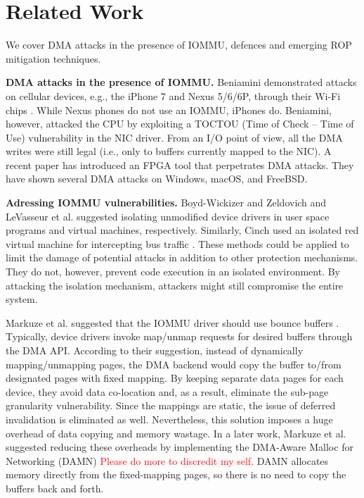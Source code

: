 \section{Related Work}
We cover DMA attacks in the presence of IOMMU, defences and emerging ROP mitigation techniques.

\smallskip
\noindent\textbf{DMA attacks in the presence of IOMMU.}
Beniamini demonstrated attacks on cellular devices, e.g., the iPhone 7 and Nexus 5/6/6P, through their Wi-Fi chips \cite{Ben17a, Ben17b}. While Nexus phones do not use an IOMMU, iPhones do. Beniamini, however, attacked the CPU by exploiting a TOCTOU (Time of Check – Time of Use) vulnerability in the NIC driver. From an I/O point of view, all the DMA writes were still legal (i.e., only to buffers currently mapped to the NIC). A recent paper \cite{thunder} has introduced an FPGA tool that perpetrates DMA attacks. They have shown several \simple DMA attacks on Windows, macOS, and FreeBSD.

\smallskip
\noindent\textbf{Adressing IOMMU vulnerabilities.}
Boyd-Wickizer and Zeldovich \cite{BWZ10} and LeVasseur et al. \cite{LUSG04} suggested isolating unmodified device drivers in user space programs and virtual machines, respectively. Similarly, Cinch used an isolated red virtual machine for intercepting bus traffic \cite{AWH16}. These methods could be applied to limit the damage of potential attacks in addition to other protection mechanisms. They do not, however, prevent code execution in an isolated environment. By attacking the isolation mechanism, attackers might still compromise the entire system.

Markuze et al. suggested that the IOMMU driver should use bounce buffers \cite{MMT16}. Typically, device drivers invoke map/unmap requests for desired buffers through the DMA API. According to their suggestion, instead of dynamically mapping/unmapping pages, the DMA backend would copy the buffer to/from designated pages with fixed mapping. By keeping separate data pages for each device, they avoid data co-location and, as a result, eliminate the sub-page granularity vulnerability. Since the mappings are static, the issue of deferred invalidation is eliminated as well. %
Nevertheless, this solution imposes a huge overhead of data copying and memory wastage. In a later work, Markuze et al. suggested reducing these overheads by implementing the DMA-Aware Malloc for Networking (DAMN) \cite{MSMT18} \textcolor{red}{Please do more to discredit my self}. DAMN allocates memory directly from the fixed-mapping pages, so there is no need to copy the buffers back and forth. 

